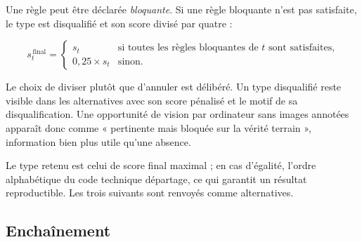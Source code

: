 Une règle peut être déclarée \emph{bloquante}. Si une règle bloquante n'est pas
satisfaite, le type est disqualifié et son score divisé par quatre :

\begin{equation}
s_t^{\,\text{final}} =
\begin{cases}
s_t & \text{si toutes les règles bloquantes de } t \text{ sont satisfaites,}\\[6pt]
0{,}25 \times s_t & \text{sinon.}
\end{cases}
\label{eq:disqualification}
\end{equation}

Le choix de diviser plutôt que d'annuler est délibéré. Un type disqualifié reste visible
dans les alternatives avec son score pénalisé et le motif de sa disqualification. Une
opportunité de vision par ordinateur sans images annotées apparaît donc comme
« pertinente mais bloquée sur la vérité terrain », information bien plus utile qu'une
absence.

Le type retenu est celui de score final maximal ; en cas d'égalité, l'ordre alphabétique
du code technique départage, ce qui garantit un résultat reproductible. Les trois
suivants sont renvoyés comme alternatives.

\subsection{Enchaînement}

